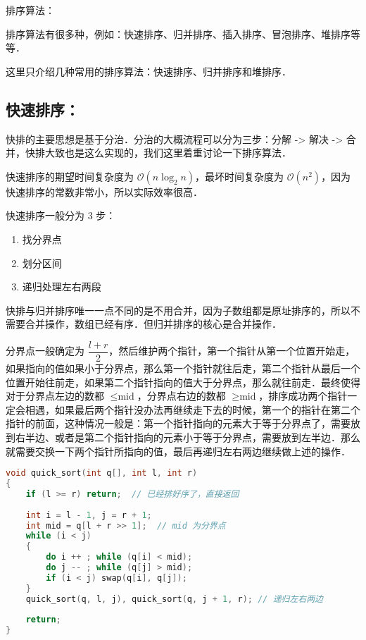 
排序算法：

排序算法有很多种，例如：快速排序、归并排序、插入排序、冒泡排序、堆排序等等．

这里只介绍几种常用的排序算法：快速排序、归并排序和堆排序．

\subsection{快速排序：}

快排的主要思想是基于分治．分治的大概流程可以分为三步：分解 -> 解决 -> 合并，快排大致也是这么实现的，我们这里着重讨论一下排序算法．

快速排序的期望时间复杂度为 $\mathcal{O}(n \log_2 n)$，最坏时间复杂度为 $\mathcal{O}(n^2)$，因为快速排序的常数非常小，所以实际效率很高．

快速排序一般分为 $3$ 步：
\begin{enumerate}
\item 找分界点
\item 划分区间
\item 递归处理左右两段
\end{enumerate}

快排与归并排序唯一一点不同的是不用合并，因为子数组都是原址排序的，所以不需要合并操作，数组已经有序．但归并排序的核心是合并操作．

分界点一般确定为 $\dfrac{l+r}{2}$，然后维护两个指针，第一个指针从第一个位置开始走，如果指向的值如果小于分界点，那么第一个指针就往后走，第二个指针从最后一个位置开始往前走，如果第二个指针指向的值大于分界点，那么就往前走．最终使得对于分界点左边的数都 $\leq \text{mid}$，分界点右边的数都 $\geq \text{mid}$，排序成功两个指针一定会相遇，如果最后两个指针没办法再继续走下去的时候，第一个的指针在第二个指针的前面，这种情况一般是：第一个指针指向的元素大于等于分界点了，需要放到右半边、或者是第二个指针指向的元素小于等于分界点，需要放到左半边．那么就需要交换一下两个指针所指向的值，最后再递归左右两边继续做上述的操作．


\begin{lstlisting}[language=cpp]
void quick_sort(int q[], int l, int r)
{
    if (l >= r) return;  // 已经排好序了，直接返回
		
    int i = l - 1, j = r + 1;
    int mid = q[l + r >> 1];  // mid 为分界点
    while (i < j)
    {
        do i ++ ; while (q[i] < mid);
        do j -- ; while (q[j] > mid);
        if (i < j) swap(q[i], q[j]);
    }
    quick_sort(q, l, j), quick_sort(q, j + 1, r); // 递归左右两边
    
    return;
}

\end{lstlisting}


